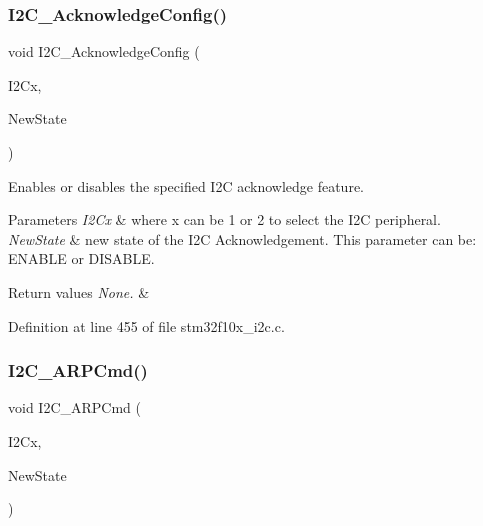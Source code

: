 \subsubsection{\texorpdfstring{I2\+C\+\_\+\+Acknowledge\+Config()}{I2C\_AcknowledgeConfig()}}
{\footnotesize\ttfamily void I2\+C\+\_\+\+Acknowledge\+Config (\begin{DoxyParamCaption}\item[{\hyperlink{struct_i2_c___type_def}{I2\+C\+\_\+\+Type\+Def} $\ast$}]{I2\+Cx,  }\item[{\hyperlink{group___exported__types_gac9a7e9a35d2513ec15c3b537aaa4fba1}{Functional\+State}}]{New\+State }\end{DoxyParamCaption})}



Enables or disables the specified I2C acknowledge feature. 


\begin{DoxyParams}{Parameters}
{\em I2\+Cx} & where x can be 1 or 2 to select the I2C peripheral. \\
\hline
{\em New\+State} & new state of the I2C Acknowledgement. This parameter can be\+: E\+N\+A\+B\+LE or D\+I\+S\+A\+B\+LE. \\
\hline
\end{DoxyParams}

\begin{DoxyRetVals}{Return values}
{\em None.} & \\
\hline
\end{DoxyRetVals}


Definition at line 455 of file stm32f10x\+\_\+i2c.\+c.

\mbox{\label{group___i2_c___exported___functions_ga66d86742bf1be58b17ef8779ffc79d02}} 
\subsubsection{\texorpdfstring{I2\+C\+\_\+\+A\+R\+P\+Cmd()}{I2C\_ARPCmd()}}
{\footnotesize\ttfamily void I2\+C\+\_\+\+A\+R\+P\+Cmd (\begin{DoxyParamCaption}\item[{\hyperlink{struct_i2_c___type_def}{I2\+C\+\_\+\+Type\+Def} $\ast$}]{I2\+Cx,  }\item[{\hyperlink{group___exported__types_gac9a7e9a35d2513ec15c3b537aaa4fba1}{Functional\+State}}]{New\+State }\end{DoxyParamCaption})}



